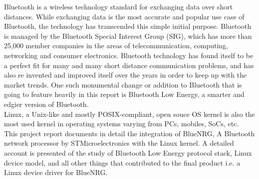 \begin{Large}
\end{Large}

\vskip 0.1in
\noindent Bluetooth is a wireless technology standard for exchanging data over short distances. While exchanging data is the most accurate and popular use case of Bluetooth, the technology has transcended this simple initial purpose. Bluetooth is managed by the Bluetooth Special Interest Group (SIG), which has more than 25,000 member companies in the areas of telecommunication, computing, networking and consumer electronics. Bluetooth technology has found itself to be a perfect fit for many and many short distance communication problems, and has also re invented and improved itself over the years in order to keep up with the market trends. One such monumental change or addition to Bluetooth that is going to feature heavily in this report is Bluetooth Low Energy, a smarter and edgier version of Bluetooth.\\

\noindent Linux, a Unix-like and mostly POSIX-compliant, open souce OS kernel is also the most used kernel in operating systems varying from PCs, mobiles, SoCs, etc.\\

\noindent This project report documents in detail the integration of BlueNRG, A Bluetooth network processor by STMicroelectronics with the Linux kernel. A detailed account is presented of the study of Bluetooth Low Energy protocol stack, Linux device model, and all other things that contributed to the final product i.e. a Linux device driver for BlueNRG.
